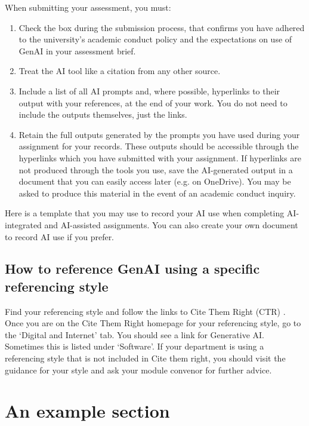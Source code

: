 \documentclass[11pt,a4paper]{article}
\begin{document}
When submitting your assessment, you must: 
\begin{enumerate}[leftmargin=.6in]
    \item Check the box during the submission process, that confirms you have adhered to the university’s academic conduct policy and the expectations on use of GenAI in your assessment brief. 
    \item Treat the AI tool like a citation from any other source. 
    \item Include a list of all AI prompts and, where possible, hyperlinks to their output with your references, at the end of your work.  You do not need to include the outputs themselves, just the links. 
    \item Retain the full outputs generated by the prompts you have used during your assignment for your records. These outputs should be accessible through the hyperlinks which you have submitted with your assignment. If hyperlinks are not produced through the tools you use, save the AI-generated output in a document that you can easily access later (e.g. on OneDrive). You may be asked to produce this material in the event of an academic conduct inquiry. 
    
\end{enumerate}

Here is a template \cite{recordAI} that you may use to record your AI use when completing AI-integrated and AI-assisted assignments. You can also create your own document to record AI use if you prefer.

\subsection{How to reference GenAI using a specific referencing style}

Find your referencing style and follow the links to Cite Them Right (CTR) \cite{ctr}. Once you are on the Cite Them Right homepage for your referencing style, go to the ‘Digital and Internet’ tab. You should see a link for Generative AI. Sometimes this is listed under ‘Software’. If your department is using a referencing style that is not included in Cite them right, you should visit the guidance for your style and ask your module convenor for further advice.

%
%
\section{An example section}
\end{document}
